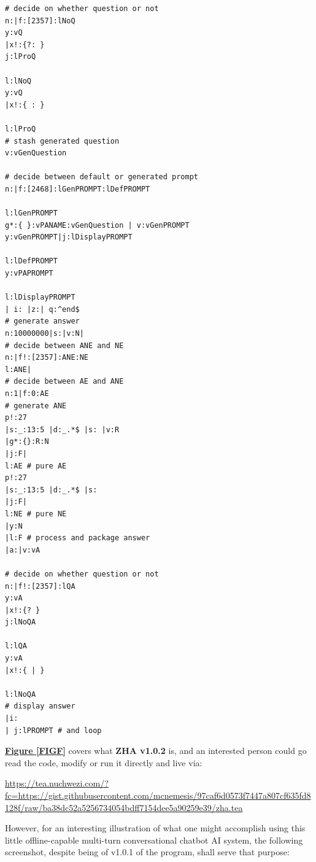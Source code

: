 \documentclass[a4paper, 18pt]{book} %
\begin{document}
\begin{tcolorbox}[teaterminalstyle, title=TEA Program: ZEE HACKER ASSISTANT v1.0.2, breakable]
\begin{lstlisting}[language=TEA,breaklines=true]
# decide on whether question or not
n:|f:[2357]:lNoQ
y:vQ
|x!:{?: }
j:lProQ

l:lNoQ
y:vQ
|x!:{ : }

l:lProQ
# stash generated question
v:vGenQuestion

# decide between default or generated prompt
n:|f:[2468]:lGenPROMPT:lDefPROMPT

l:lGenPROMPT
g*:{ }:vPANAME:vGenQuestion | v:vGenPROMPT
y:vGenPROMPT|j:lDisplayPROMPT

l:lDefPROMPT
y:vPAPROMPT

l:lDisplayPROMPT
| i: |z:| q:^end$
# generate answer
n:10000000|s:|v:N|
# decide between ANE and NE
n:|f!:[2357]:ANE:NE
l:ANE|
# decide between AE and ANE
n:1|f:0:AE
# generate ANE
p!:27
|s:_:13:5 |d:_.*$ |s: |v:R
|g*:{}:R:N
|j:F|
l:AE # pure AE
p!:27
|s:_:13:5 |d:_.*$ |s:
|j:F|
l:NE # pure NE
|y:N
|l:F # process and package answer 
|a:|v:vA

# decide on whether question or not
n:|f!:[2357]:lQA
y:vA
|x!:{? }
j:lNoQA

l:lQA
y:vA
|x!:{ | }

l:lNoQA
# display answer
|i: 
| j:lPROMPT # and loop
   \end{lstlisting}
  \end{tcolorbox}
  \label{FIGF}
  \vspace{1cm}


 \large
 \raggedright %
  
 
 \textbf{\hyperref[FIGF]{Figure \ref{FIGF}}} covers what \textbf{ZHA v1.0.2} is, and an interested person could go read the code, modify or run it directly and live via:
  
  
\vspace{1em}

 \url{https://tea.nuchwezi.com/?fc=https://gist.githubusercontent.com/mcnemesis/97caf6d0573f7447a807cf635fd8128f/raw/ba38dc52a5256734054bdff7154dee5a90259e39/zha.tea}

\vspace{1em}

However, for an interesting illustration of what one might accomplish using this little offline-capable multi-turn conversational chatbot AI system, the following screenshot, despite being of v1.0.1 of the program, shall serve that purpose:
\end{document}
